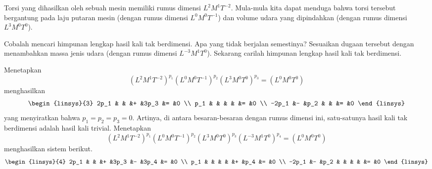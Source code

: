 \begin{exercises}
  \item 
    \cite{Giordano83}
    Torsi yang dihasilkan oleh sebuah mesin
    memiliki rumus dimensi $L^2M^1T^{-2}$.
    Mula-mula kita dapat menduga bahwa torsi tersebut bergantung pada
    laju putaran mesin (dengan rumus dimensi
    $L^0M^0T^{-1}$) dan volume udara yang dipindahkan (dengan rumus
    dimensi $L^3M^0T^0$).
    \begin{exparts}
      \partsitem Cobalah mencari himpunan lengkap hasil kali tak berdimensi.
        Apa yang tidak berjalan semestinya?
      \partsitem Sesuaikan dugaan tersebut dengan menambahkan massa jenis udara
        (dengan rumus dimensi $L^{-3}M^1T^0$).
        Sekarang carilah himpunan lengkap hasil kali tak berdimensi.
    \end{exparts}
    \begin{answer}
      \begin{exparts}
        \partsitem Menetapkan
          \begin{equation*}
            (L^2M^1T^{-2})^{p_1}(L^0M^0T^{-1})^{p_2}(L^{3}M^0T^0)^{p_3}
              =(L^0M^0T^0)
          \end{equation*}
          menghasilkan
          \begin{equation*}
            \begin{linsys}{3}
              2p_1  &   &    &+  &3p_3  &=  &0  \\
              p_1   &   &    &   &      &=  &0  \\
              -2p_1 &-  &p_2 &   &      &=  &0  
            \end{linsys}
          \end{equation*}
          yang menyiratkan bahwa $p_1=p_2=p_3=0$.
          Artinya, di antara besaran-besaran dengan rumus dimensi ini, satu-satunya
          hasil kali tak berdimensi adalah hasil kali trivial.
        \partsitem Menetapkan
          \begin{equation*}
            (L^2M^1T^{-2})^{p_1}(L^0M^0T^{-1})^{p_2}(L^{3}M^0T^0)^{p_3}
              (L^{-3}M^1T^0)^{p_4}=(L^0M^0T^0)
          \end{equation*}
          menghasilkan sistem berikut.
          \begin{multline*}
            \begin{linsys}{4}
              2p_1  &   &    &+  &3p_3  &-  &3p_4 &=  &0  \\
              p_1   &   &    &   &      &+  &p_4  &=  &0  \\
              -2p_1 &-  &p_2 &   &      &   &     &=  &0  

\end{linsys}
\end{multline*}
\end{exparts}
\end{answer}
\end{exercises}
